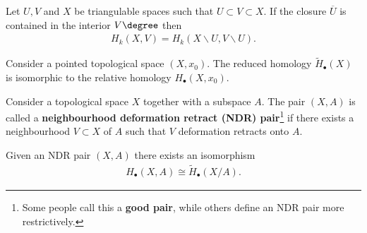     \begin{theorem}\label{topology:theorem:excision}
        Let $U, V$ and $X$ be triangulable spaces such that $U\subset V\subset X$. If the closure $\overline{U}$ is contained in the interior $V\degree$ then
        \begin{gather}
            H_k(X, V) = H_k(X\backslash U, V\backslash U).
        \end{gather}
    \end{theorem}

    \begin{property}
        Consider a pointed topological space $(X, x_0)$. The reduced homology $\widetilde{H}_\bullet(X)$ is isomorphic to the relative homology $H_\bullet(X, x_0)$.
    \end{property}

    \begin{property}\label{topology:ndr_pair_homology}
        Consider a topological space $X$ together with a subspace $A$. The pair $(X,A)$ is called a \textbf{neighbourhood deformation retract (NDR) pair}\footnote{Some people call this a \textbf{good pair}, while others define an NDR pair more restrictively.} if there exists a neighbourhood $V\subset X$ of $A$ such that $V$ deformation retracts onto $A$.

        Given an NDR pair $(X,A)$ there exists an isomorphism
        \begin{gather}
            H_\bullet(X,A)\cong\widetilde{H}_\bullet(X/A).
        \end{gather}
    \end{property}

